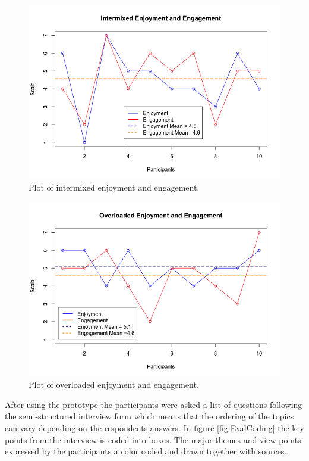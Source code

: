     \begin{figure}[H]
        \centering
        \includegraphics[width=0.99\linewidth]{figure/Evaluation/IEnjoy.png}
        \caption{Plot of intermixed enjoyment and engagement.}
        \label{fig:IntermixedEnjoyEngage}
    \end{figure}
    \begin{figure}[H]
        \centering
        \includegraphics[width=0.99\linewidth]{figure/Evaluation/OEnjoy.png}
        \caption{Plot of overloaded enjoyment and engagement.}
        \label{fig:OverloadEnjoyEngage}
    \end{figure}

After using the prototype the participants were asked a list of questions following the semi-structured interview form which means that the ordering of the topics can vary depending on the respondents answers. In figure \autoref{fig:EvalCoding} the key points from the interview is coded into boxes. The major themes and view points expressed by the participants a color coded and drawn together with sources.

